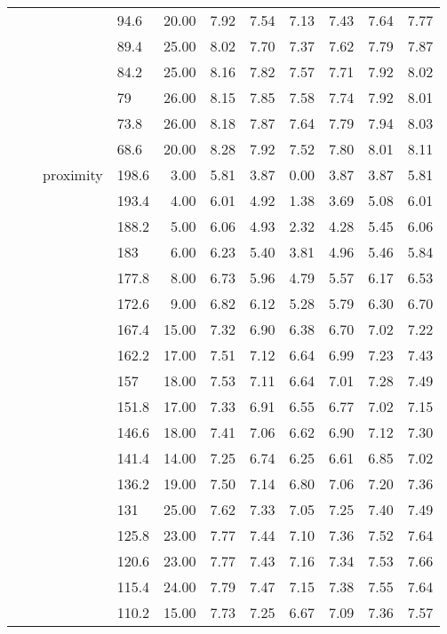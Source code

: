 \begin{longtable}{llllrrrrrrr}
   &  &  & 94.6 & 20.00 & 7.92 & 7.54 & 7.13 & 7.43 & 7.64 & 7.77 \\ 
   &  &  & 89.4 & 25.00 & 8.02 & 7.70 & 7.37 & 7.62 & 7.79 & 7.87 \\ 
   &  &  & 84.2 & 25.00 & 8.16 & 7.82 & 7.57 & 7.71 & 7.92 & 8.02 \\ 
   &  &  & 79 & 26.00 & 8.15 & 7.85 & 7.58 & 7.74 & 7.92 & 8.01 \\ 
   &  &  & 73.8 & 26.00 & 8.18 & 7.87 & 7.64 & 7.79 & 7.94 & 8.03 \\ 
   &  &  & 68.6 & 20.00 & 8.28 & 7.92 & 7.52 & 7.80 & 8.01 & 8.11 \\ 
   &  & proximity & 198.6 & 3.00 & 5.81 & 3.87 & 0.00 & 3.87 & 3.87 & 5.81 \\ 
   &  &  & 193.4 & 4.00 & 6.01 & 4.92 & 1.38 & 3.69 & 5.08 & 6.01 \\ 
   &  &  & 188.2 & 5.00 & 6.06 & 4.93 & 2.32 & 4.28 & 5.45 & 6.06 \\ 
   &  &  & 183 & 6.00 & 6.23 & 5.40 & 3.81 & 4.96 & 5.46 & 5.84 \\ 
   &  &  & 177.8 & 8.00 & 6.73 & 5.96 & 4.79 & 5.57 & 6.17 & 6.53 \\ 
   &  &  & 172.6 & 9.00 & 6.82 & 6.12 & 5.28 & 5.79 & 6.30 & 6.70 \\ 
   &  &  & 167.4 & 15.00 & 7.32 & 6.90 & 6.38 & 6.70 & 7.02 & 7.22 \\ 
   &  &  & 162.2 & 17.00 & 7.51 & 7.12 & 6.64 & 6.99 & 7.23 & 7.43 \\ 
   &  &  & 157 & 18.00 & 7.53 & 7.11 & 6.64 & 7.01 & 7.28 & 7.49 \\ 
   &  &  & 151.8 & 17.00 & 7.33 & 6.91 & 6.55 & 6.77 & 7.02 & 7.15 \\ 
   &  &  & 146.6 & 18.00 & 7.41 & 7.06 & 6.62 & 6.90 & 7.12 & 7.30 \\ 
   &  &  & 141.4 & 14.00 & 7.25 & 6.74 & 6.25 & 6.61 & 6.85 & 7.02 \\ 
   &  &  & 136.2 & 19.00 & 7.50 & 7.14 & 6.80 & 7.06 & 7.20 & 7.36 \\ 
   &  &  & 131 & 25.00 & 7.62 & 7.33 & 7.05 & 7.25 & 7.40 & 7.49 \\ 
   &  &  & 125.8 & 23.00 & 7.77 & 7.44 & 7.10 & 7.36 & 7.52 & 7.64 \\ 
   &  &  & 120.6 & 23.00 & 7.77 & 7.43 & 7.16 & 7.34 & 7.53 & 7.66 \\ 
   &  &  & 115.4 & 24.00 & 7.79 & 7.47 & 7.15 & 7.38 & 7.55 & 7.64 \\ 
   &  &  & 110.2 & 15.00 & 7.73 & 7.25 & 6.67 & 7.09 & 7.36 & 7.57 \\ 

\end{longtable}
